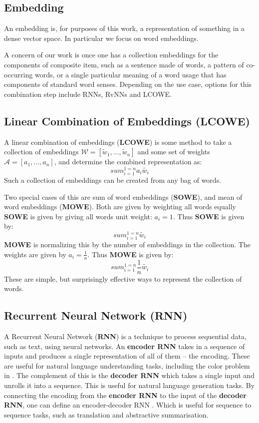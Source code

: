 \documentclass{book}
\begin{document}
\subsection{Embedding}
An embedding is, for purposes of this work,
a representation of something in a dense vector space.
In particular we focus on word embeddings.

A concern of our work is once one has  a collection embeddings for the components of composite item,
such as a sentence made of words,
a pattern of co-occurring words,
or a single particular meaning of a word usage that has components of standard word senses.
Depending on the use case,
options for this combination step include
RNNs, RvNNs and LCOWE.

\subsection{Linear Combination of Embeddings (LCOWE)}
A linear combination of embeddings (\textbf{LCOWE}) is some method 
to take a collection of embeddings $\mathcal{W}= [ \tilde{w}_1,\ldots,\tilde{w}_n ]$
and some set of weights $\mathcal{A}= [ a_1, \ldots, a_n ]$,
and determine the combined representation as:
\begin{equation}
sum_{i=1}^{1=n} a_i \tilde{w_i}
\end{equation}
Such a collection of embeddings can be created from  any bag of words.

Two special cases of this are sum of word embeddings (\textbf{SOWE}), and mean of word embeddings (\textbf{MOWE}).
Both are given by weighting all words equally
\textbf{SOWE} is given by giving all words unit weight: $a_i = 1$.
Thus \textbf{SOWE} is given by:
\begin{equation}
sum_{i=1}^{1=n} \tilde{w_i}
\end{equation}
\textbf{MOWE} is normalizing this by the number of embeddings in the collection.
The weights are given by $a_i = \frac{1}{n}$.
Thus \textbf{MOWE} is given by:
\begin{equation}
sum_{i=1}^{1=n}  \frac{1}{n} \tilde{w_i}
\end{equation}
These  are simple, but surprisingly effective ways to represent the collection of words.

\subsection {Recurrent Neural Network (RNN)}
A Recurrent Neural Network (\textbf{RNN}) is a technique 
to process sequential data, such as text, using neural networks.
An \textbf{encoder RNN} takes in a sequence of inputs and produces a single representation of all of them
-- the encoding.
These are useful for natural language understanding tasks, including the color problem in .
The complement of this is the \textbf{decoder RNN} which takes a single input and unrolls it into a sequence.
This is useful for natural language generation tasks.
By connecting the encoding from the \textbf{encoder RNN} to the input of the \textbf{decoder RNN},
one can define an encoder-decoder RNN \citep{cho2014properties}.
Which is  useful for sequence to sequence tasks, such as translation and abstractive summarisation.
\end{document}
